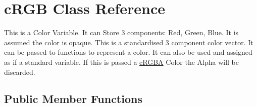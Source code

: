 \hypertarget{classc_r_g_b}{
\section{cRGB Class Reference}
\label{classc_r_g_b}
}


This is a Color Variable. It can Store 3 components: Red, Green, Blue. It is assumed the color is opaque. This is a standardised 3 component color vector. It can be passed to functions to represent a color. It can also be used and assigned as if a standard variable. If this is passed a \hyperlink{classc_r_g_b_a}{cRGBA} Color the Alpha will be discarded.  


\subsection*{Public Member Functions}
